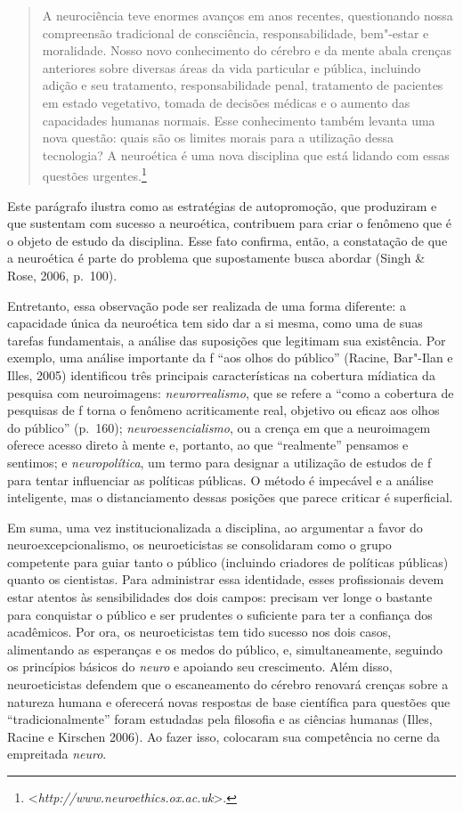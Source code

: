 \begin{quote}
A neurociência teve enormes avanços em anos recentes, questionando nossa
compreensão tradicional de consciência, responsabilidade, bem"-estar e
moralidade. Nosso novo conhecimento do cérebro e da mente abala crenças
anteriores sobre diversas áreas da vida particular e pública, incluindo
adição e seu tratamento, responsabilidade penal, tratamento de pacientes
em estado vegetativo, tomada de decisões médicas e o aumento das
capacidades humanas normais. Esse conhecimento também levanta uma nova
questão: quais são os limites morais para a utilização dessa tecnologia?
A neuroética é uma nova disciplina que está lidando com essas questões
urgentes.\footnote[5]{\textless{}\emph{http://www.neuroethics.ox.ac.uk}\textgreater{}.}
\end{quote}

Este parágrafo ilustra como as estratégias de autopromoção, que
produziram e que sustentam com sucesso a neuroética, contribuem para
criar o fenômeno que é o objeto de estudo da disciplina. Esse fato
confirma, então, a constatação de que a neuroética é parte do problema
que supostamente busca abordar (Singh \& Rose, 2006, p.~100).

Entretanto, essa observação pode ser realizada de uma forma diferente: a
capacidade única da neuroética tem sido dar a si mesma, como uma de suas
tarefas fundamentais, a análise das suposições que legitimam sua
existência. Por exemplo, uma análise importante da f ``aos olhos do
público'' (Racine, Bar"-Ilan e Illes, 2005) identificou três principais
características na cobertura mídiatica da pesquisa com neuroimagens:
\emph{neurorrealismo}, que se refere a ``como a cobertura de pesquisas
de f torna o fenômeno acriticamente real, objetivo ou eficaz aos
olhos do público'' (p.~160); \emph{neuroessencialismo}, ou a crença em
que a neuroimagem oferece acesso direto à mente e, portanto, ao que
``realmente'' pensamos e sentimos; e \emph{neuropolítica}, um termo para
designar a utilização de estudos de f para tentar influenciar as
políticas públicas. O método é impecável e a análise inteligente, mas o
distanciamento dessas posições que parece criticar é superficial.

Em suma, uma vez institucionalizada a disciplina, ao argumentar a favor
do neuroexcepcionalismo, os neuroeticistas se consolidaram como o grupo
competente para guiar tanto o público (incluindo criadores de políticas
públicas) quanto os cientistas. Para administrar essa identidade, esses
profissionais devem estar atentos às sensibilidades dos dois campos:
precisam ver longe o bastante para conquistar o público e ser prudentes
o suficiente para ter a confiança dos acadêmicos. Por ora, os
neuroeticistas tem tido sucesso nos dois casos, alimentando as
esperanças e os medos do público, e, simultaneamente, seguindo os
princípios básicos do \emph{neuro} e apoiando seu crescimento. Além
disso, neuroeticistas defendem que o escaneamento do cérebro renovará
crenças sobre a natureza humana e oferecerá novas respostas de base
científica para questões que ``tradicionalmente'' foram estudadas pela
filosofia e as ciências humanas (Illes, Racine e Kirschen 2006). Ao
fazer isso, colocaram sua competência no cerne da empreitada
\emph{neuro}.

